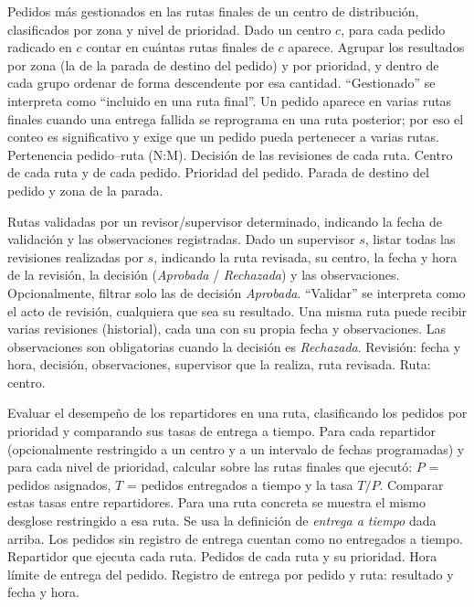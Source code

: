\documentclass[11pt,a4paper]{article}
\begin{document}
{Pedidos más gestionados en las rutas finales de un centro de distribución, clasificados por zona y nivel de prioridad.}
{Dado un centro $c$, para cada pedido radicado en $c$ contar en cuántas rutas finales de $c$ aparece. Agrupar los resultados por zona (la de la parada de destino del pedido) y por prioridad, y dentro de cada grupo ordenar de forma descendente por esa cantidad.}
{``Gestionado'' se interpreta como ``incluido en una ruta final''. Un pedido aparece en varias rutas finales cuando una entrega fallida se reprograma en una ruta posterior; por eso el conteo es significativo y exige que un pedido pueda pertenecer a varias rutas.}
{Pertenencia pedido--ruta (N:M). Decisión de las revisiones de cada ruta. Centro de cada ruta y de cada pedido. Prioridad del pedido. Parada de destino del pedido y zona de la parada.}

{Rutas validadas por un revisor/supervisor determinado, indicando la fecha de validación y las observaciones registradas.}
{Dado un supervisor $s$, listar todas las revisiones realizadas por $s$, indicando la ruta revisada, su centro, la fecha y hora de la revisión, la decisión (\textit{Aprobada} / \textit{Rechazada}) y las observaciones. Opcionalmente, filtrar solo las de decisión \textit{Aprobada}.}
{``Validar'' se interpreta como el acto de revisión, cualquiera que sea su resultado. Una misma ruta puede recibir varias revisiones (historial), cada una con su propia fecha y observaciones. Las observaciones son obligatorias cuando la decisión es \textit{Rechazada}.}
{Revisión: fecha y hora, decisión, observaciones, supervisor que la realiza, ruta revisada. Ruta: centro.}

{Evaluar el desempeño de los repartidores en una ruta, clasificando los pedidos por prioridad y comparando sus tasas de entrega a tiempo.}
{Para cada repartidor (opcionalmente restringido a un centro y a un intervalo de fechas programadas) y para cada nivel de prioridad, calcular sobre las rutas finales que ejecutó: $P$ = pedidos asignados, $T$ = pedidos entregados a tiempo y la tasa $T/P$. Comparar estas tasas entre repartidores. Para una ruta concreta se muestra el mismo desglose restringido a esa ruta.}
{Se usa la definición de \textit{entrega a tiempo} dada arriba. Los pedidos sin registro de entrega cuentan como no entregados a tiempo.}
{Repartidor que ejecuta cada ruta. Pedidos de cada ruta y su prioridad. Hora límite de entrega del pedido. Registro de entrega por pedido y ruta: resultado y fecha y hora.}
\end{document}
